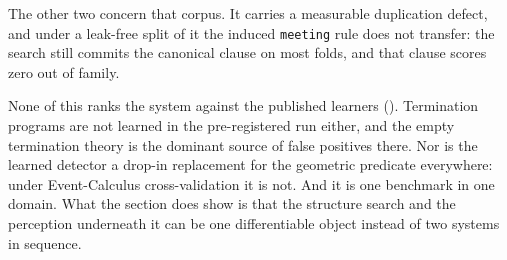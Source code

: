 The other two concern that corpus. It carries a measurable duplication defect, and under a leak-free split of it the induced \texttt{meeting} rule does not transfer: the search still commits the canonical clause on most folds, and that clause scores zero out of family.

None of this ranks the system against the published learners (). Termination programs are not learned in the pre-registered run either, and the empty termination theory is the dominant source of false positives there. Nor is the learned detector a drop-in replacement for the geometric predicate everywhere: under Event-Calculus cross-validation it is not. And it is one benchmark in one domain. What the section does show is that the structure search and the perception underneath it can be one differentiable object instead of two systems in sequence.
